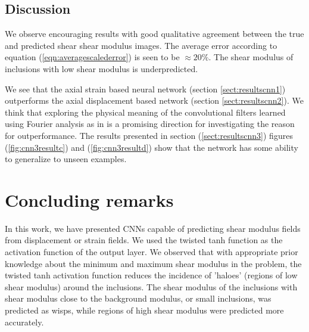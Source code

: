 \documentclass[12pt]{article}
\begin{document}
\subsection{Discussion}
We observe encouraging results with good qualitative agreement between the true and predicted shear shear modulus images. The average error according to equation (\ref{eqn:averagescalederror}) is seen to be $\approx{20\%}$. The shear modulus of inclusions with low shear modulus is underpredicted.

We see that the axial strain based neural network (section {\ref{sect:resultscnn1}}) outperforms the axial displacement based network (section \ref{sect:resultscnn2}). We think that exploring the physical meaning of the convolutional filters learned using Fourier analysis as in \cite{paper:pateloberai2019} is a promising direction for investigating the reason for outperformance. The results presented in section (\ref{sect:resultscnn3}) figures (\ref{fig:cnn3resultc}) and (\ref{fig:cnn3resultd}) show that the network has some ability to generalize to unseen examples.
%
\section{Concluding remarks}
In this work, we have presented CNNs capable of predicting shear modulus fields from displacement or strain fields. We used the twisted tanh function as the activation function of the output layer. We observed that with appropriate prior knowledge about the minimum and maximum shear modulus in the problem, the twisted tanh activation function reduces the incidence of 'haloes' (regions of low shear modulus) around the inclusions. The shear modulus of the inclusions with shear modulus close to the background modulus, or small inclusions, was predicted as wisps, while regions of high shear modulus were predicted more accurately.    
\end{document}
